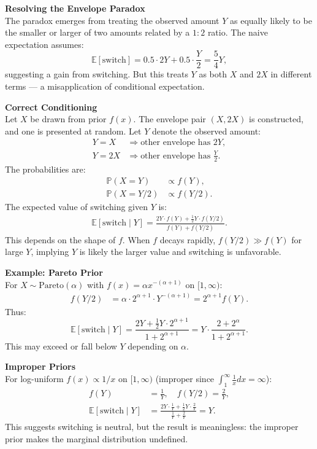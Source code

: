 \begin{technical}
{\Large\textbf{Resolving the Envelope Paradox}}\\[0.7em]

The paradox emerges from treating the observed amount $Y$ as equally likely to be the smaller or larger of two amounts related by a $1:2$ ratio. The naive expectation assumes:
\[
\mathbb{E}[\text{switch}] = 0.5 \cdot 2Y + 0.5 \cdot \frac{Y}{2} = \frac{5}{4}Y,
\]
suggesting a gain from switching. But this treats $Y$ as both $X$ and $2X$ in different terms — a misapplication of conditional expectation.

\textbf{Correct Conditioning}\\[0.5em]
Let $X$ be drawn from prior $f(x)$. The envelope pair $(X, 2X)$ is constructed, and one is presented at random. Let $Y$ denote the observed amount:
\begin{align}
Y = X &\Rightarrow \text{other envelope has } 2Y,\\
Y = 2X &\Rightarrow \text{other envelope has } \frac{Y}{2}.
\end{align}
The probabilities are:
\begin{align}
\mathbb{P}(X = Y) &\propto f(Y), \\
\mathbb{P}(X = Y/2) &\propto f(Y/2).
\end{align}
The expected value of switching given $Y$ is:
\begin{align}
\mathbb{E}[\text{switch} \mid Y] 
= \frac{2Y \cdot f(Y) + \tfrac{1}{2}Y \cdot f(Y/2)}{f(Y) + f(Y/2)}.
\end{align}
This depends on the shape of $f$. When $f$ decays rapidly, $f(Y/2) \gg f(Y)$ for large $Y$, implying $Y$ is likely the larger value and switching is unfavorable.

\textbf{Example: Pareto Prior}\\[0.5em]
For $X \sim \text{Pareto}(\alpha)$ with $f(x) = \alpha x^{-(\alpha + 1)}$ on $[1, \infty)$:
\begin{align}
f(Y/2) &= \alpha \cdot 2^{\alpha + 1} \cdot Y^{-(\alpha + 1)} = 2^{\alpha + 1} f(Y).
\end{align}
Thus:
\[
\mathbb{E}[\text{switch} \mid Y] = \frac{2Y + \tfrac{1}{2}Y \cdot 2^{\alpha + 1}}{1 + 2^{\alpha + 1}} = Y \cdot \frac{2 + 2^{\alpha}}{1 + 2^{\alpha + 1}}.
\]
This may exceed or fall below $Y$ depending on $\alpha$.

\textbf{Improper Priors}\\[0.5em]
For log-uniform $f(x) \propto 1/x$ on $[1, \infty)$ (improper since $\int_1^{\infty} \frac{1}{x} dx = \infty$):
\begin{align}
f(Y) &= \frac{1}{Y}, \quad f(Y/2) = \frac{2}{Y},\\
\mathbb{E}[\text{switch} \mid Y] &= \frac{2Y \cdot \frac{1}{Y} + \tfrac{1}{2}Y \cdot \frac{2}{Y}}{\frac{1}{Y} + \frac{2}{Y}} = Y.
\end{align}
This suggests switching is neutral, but the result is meaningless: the improper prior makes the marginal distribution undefined. 


\end{technical}
